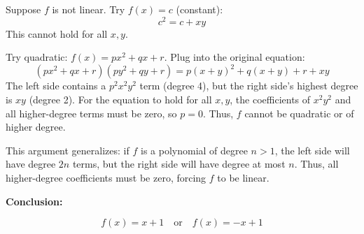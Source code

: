 \documentclass{article}
\begin{document}
Suppose $f$ is not linear. Try $f(x) = c$ (constant):
\[
c^2 = c + xy
\]
This cannot hold for all $x, y$.

Try quadratic: $f(x) = px^2 + qx + r$. Plug into the original equation:
\[
(px^2 + qx + r)(py^2 + qy + r) = p(x+y)^2 + q(x+y) + r + xy
\]
The left side contains a $p^2x^2y^2$ term (degree 4), but the right side's highest degree is $xy$ (degree 2). For the equation to hold for all $x, y$, the coefficients of $x^2y^2$ and all higher-degree terms must be zero, so $p = 0$. Thus, $f$ cannot be quadratic or of higher degree.

This argument generalizes: if $f$ is a polynomial of degree $n > 1$, the left side will have degree $2n$ terms, but the right side will have degree at most $n$. Thus, all higher-degree coefficients must be zero, forcing $f$ to be linear.

\textbf{Conclusion:}

\[
\boxed{
f(x) = x + 1 \quad \text{or} \quad f(x) = -x + 1
}
\]
\end{document}

